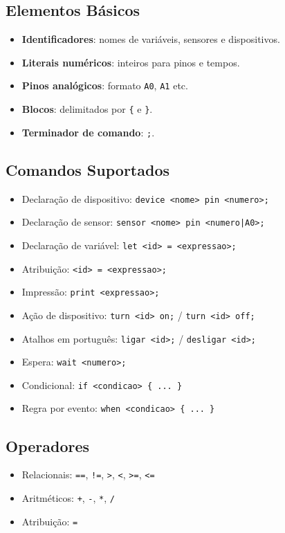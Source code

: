 \documentclass[12pt,a4paper]{article}
\begin{document}
\subsection{Elementos Básicos}
\begin{itemize}
  \item \textbf{Identificadores}: nomes de variáveis, sensores e dispositivos.
  \item \textbf{Literais numéricos}: inteiros para pinos e tempos.
  \item \textbf{Pinos analógicos}: formato \texttt{A0}, \texttt{A1} etc.
  \item \textbf{Blocos}: delimitados por \texttt{\{} e \texttt{\}}.
  \item \textbf{Terminador de comando}: \texttt{;}.
\end{itemize}

\subsection{Comandos Suportados}
\begin{itemize}
  \item Declaração de dispositivo: \texttt{device <nome> pin <numero>;}
  \item Declaração de sensor: \texttt{sensor <nome> pin <numero|A0>;}
  \item Declaração de variável: \texttt{let <id> = <expressao>;}
  \item Atribuição: \texttt{<id> = <expressao>;}
  \item Impressão: \texttt{print <expressao>;}
  \item Ação de dispositivo: \texttt{turn <id> on;} / \texttt{turn <id> off;}
  \item Atalhos em português: \texttt{ligar <id>;} / \texttt{desligar <id>;}
  \item Espera: \texttt{wait <numero>;}
  \item Condicional: \texttt{if <condicao> \{ ... \}}
  \item Regra por evento: \texttt{when <condicao> \{ ... \}}
\end{itemize}

\subsection{Operadores}
\begin{itemize}
  \item Relacionais: \texttt{==}, \texttt{!=}, \texttt{>}, \texttt{<}, \texttt{>=}, \texttt{<=}
  \item Aritméticos: \texttt{+}, \texttt{-}, \texttt{*}, \texttt{/}
  \item Atribuição: \texttt{=}
\end{itemize}
\end{document}
